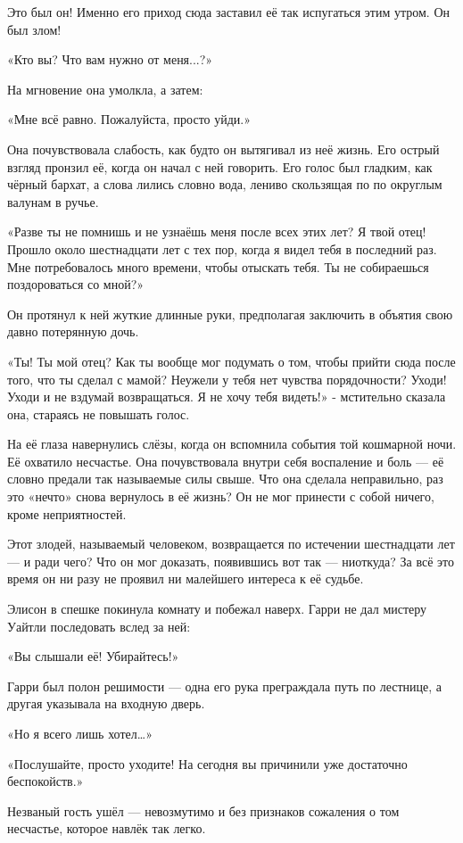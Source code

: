 \documentclass[a5paper, 9pt,
final, openany, twoside=true]{memoir}
\begin{document}
Это был он! Именно его приход сюда заставил её так испугаться этим утром. Он был злом!

«Кто вы? Что вам нужно от меня...?»

На мгновение она умолкла, а затем:

«Мне всё равно. Пожалуйста, просто уйди.»

Она почувствовала слабость, как будто он вытягивал из неё жизнь. Его острый взгляд пронзил её, когда он начал с ней говорить. Его голос был гладким, как чёрный бархат, а слова лились словно вода, лениво скользящая по по округлым валунам в ручье.

«Разве ты не помнишь и не узнаёшь меня после всех этих лет? Я твой отец! Прошло около шестнадцати лет с тех пор, когда я видел тебя в последний раз. Мне потребовалось много времени, чтобы отыскать тебя. Ты не собираешься поздороваться со мной?»

Он протянул к ней жуткие длинные руки, предполагая заключить в объятия свою давно потерянную дочь.

«Ты! Ты мой отец? Как ты вообще мог подумать о том, чтобы прийти сюда после того, что ты сделал с мамой? Неужели у тебя нет чувства порядочности? Уходи! Уходи и не вздумай возвращаться. Я не хочу тебя видеть!» - мстительно сказала она, стараясь не повышать голос.

На её глаза навернулись слёзы, когда он вспомнила события той кошмарной ночи. Её охватило несчастье. Она почувствовала внутри себя воспаление и боль — её словно предали так называемые силы свыше. Что она сделала неправильно, раз это «нечто» снова вернулось в её жизнь? Он не мог принести с собой ничего, кроме неприятностей.

Этот злодей, называемый человеком, возвращается по истечении шестнадцати лет — и ради чего? Что он мог доказать, появившись вот так — ниоткуда? За всё это время он ни разу не проявил ни малейшего интереса к её судьбе.

Элисон в спешке покинула комнату и побежал наверх. Гарри не дал мистеру Уайтли последовать вслед за ней:

«Вы слышали её! Убирайтесь!»

Гарри был полон решимости — одна его рука преграждала путь по лестнице, а другая указывала на входную дверь.

«Но я всего лишь хотел…»

«Послушайте, просто уходите! На сегодня вы причинили уже достаточно беспокойств.»

Незваный гость ушёл — невозмутимо и без признаков сожаления о том несчастье, которое навлёк так легко.
\end{document}
